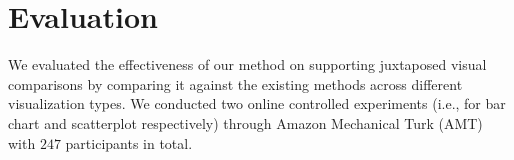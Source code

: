 \section {Evaluation}
\label{sec:results}

We evaluated the effectiveness of our method on supporting juxtaposed visual comparisons by comparing it against the existing methods across different visualization types.
We conducted two online controlled experiments (i.e., for bar chart and scatterplot respectively) through Amazon Mechanical Turk (AMT) with $247$ participants in total. 

